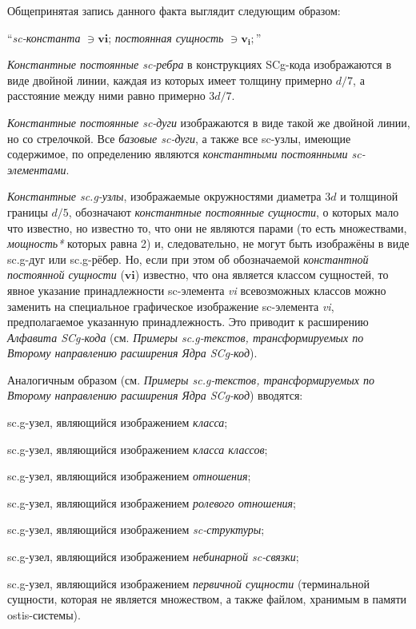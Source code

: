 \begin{SCn}
{Общепринятая запись данного факта выглядит следующим образом:

``\textit{sc-константа} $\ni \bm{vi}$; \textit{постоянная сущность} $\ni \bm{v_i};$''

\textit{Константные постоянные sc-ребра} в конструкциях SCg-кода изображаются в виде двойной линии, каждая из которых имеет толщину примерно $d/7$, а расстояние между ними равно примерно $3d/7$. 

\textit{Константные постоянные sc-дуги} изображаются в виде такой же двойной линии, но со стрелочкой. Все \textit{базовые sc-дуги}, а также все sc-узлы, имеющие содержимое, по определению являются \textit{константными постоянными sc-элементами}. 

\textit{Константные sc.g-узлы}, изображаемые окружностями диаметра $3d$ и толщиной границы $d/5$, обозначают \textit{константные постоянные сущности}, о которых мало что известно, но известно то, что они не являются парами (то есть множествами, \textit{мощность*} которых равна 2) и, следовательно, не могут быть изображёны в виде sc.g-дуг или sc.g-рёбер. Но, если при этом об обозначаемой \textit{константной постоянной сущности} ($\bm{vi}$) известно, что она является классом сущностей, то явное указание принадлежности sc-элемента \textit{vi} всевозможных классов можно заменить на специальное графическое изображение sc-элемента \textit{vi}, предполагаемое указанную принадлежность. Это приводит к расширению  \textit{Алфавита SCg-кода} (см. \textit{Примеры sc.g-текстов, трансформируемых по Второму направлению расширения Ядра SCg-код}).

Аналогичным образом (см. \textit{Примеры sc.g-текстов, трансформируемых по Второму направлению расширения Ядра SCg-код}) вводятся: 
\begin{scnitemize}
\item sc.g-узел, являющийся изображением \textit{класса};  
\item sc.g-узел, являющийся изображением \textit{класса классов};  
\item sc.g-узел, являющийся изображением \textit{отношения}; 
\item sc.g-узел, являющийся изображением \textit{ролевого отношения}; 
\item sc.g-узел, являющийся изображением \textit{sc-структуры};  
\item sc.g-узел, являющийся изображением \textit{небинарной sc-связки};
\item sc.g-узел, являющийся изображением \textit{первичной сущности} (терминальной сущности, которая не является множеством, а также файлом, хранимым в памяти ostis-системы).
\end{scnitemize}

}
\end{SCn}
